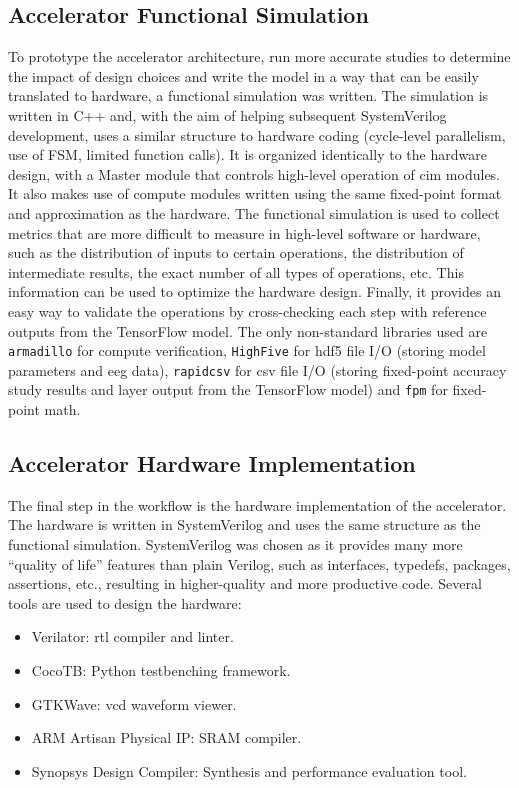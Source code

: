 \subsection{Accelerator Functional Simulation}
To prototype the accelerator architecture, run more accurate studies to determine the impact of design choices and write the model in a way that can be easily translated to 
hardware, a functional simulation was written. The simulation is written in C++ and, with the aim of helping subsequent SystemVerilog development, uses a similar structure to
hardware coding (cycle-level parallelism, use of FSM, limited function calls). It is organized identically to the hardware design, with a Master module that controls high-level
operation of \ac{cim} modules. It also makes use of compute modules written using the same fixed-point format and approximation as the hardware. The functional  simulation is
used to collect metrics that are more difficult to measure in high-level software or hardware, such as the distribution of inputs to certain operations, the distribution of
intermediate results, the exact number of all types of operations, etc. This information can be used to optimize the hardware design. Finally, it provides an easy way to validate
the operations by cross-checking each step with reference outputs from the TensorFlow model. The only non-standard libraries used are \texttt{armadillo} for compute verification,
\texttt{HighFive} for \ac{hdf5} file I/O (storing model parameters and \ac{eeg} data), \texttt{rapidcsv} for \ac{csv} file I/O (storing fixed-point accuracy study results and
layer output from the TensorFlow model) and \texttt{fpm} for fixed-point math.

\subsection{Accelerator Hardware Implementation}
The final step in the workflow is the hardware implementation of the accelerator. The hardware is written in SystemVerilog and uses the same structure as the functional simulation.
SystemVerilog was chosen as it provides many more ``quality of life'' features than plain Verilog, such as interfaces, typedefs, packages, assertions, etc., resulting in higher-quality
and more productive code. Several tools are used to design the hardware:
\begin{itemize}
    \item Verilator: \ac{rtl} compiler and linter.
    \item CocoTB: Python testbenching framework.
    \item GTKWave: \ac{vcd} waveform viewer.
    \item ARM Artisan Physical IP: SRAM compiler.
    \item Synopsys Design Compiler: Synthesis and performance evaluation tool.
\end{itemize}

